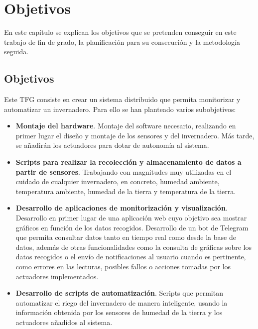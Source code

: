 \documentclass[a4paper, 12pt, oneside]{book}
\begin{document}
\cleardoublepage %
\chapter{Objetivos} %
\label{chap:objetivos} %
En este capítulo se explican los objetivos que se pretenden conseguir en este trabajo de fin de grado, la planificación para su consecución y la metodología seguida.


\section{Objetivos}
\label{sec:objetivos}

Este TFG consiste en crear un sistema distribuido que permita monitorizar y automatizar un invernadero. Para ello se han planteado varios subobjetivos:

\begin{itemize}
\item \textbf{Montaje del hardware}. Montaje del software necesario, realizando en primer lugar el diseño y montaje de los sensores y del invernadero. Más tarde, se añadirán los actuadores para dotar de autonomía al sistema. 

\item \textbf{Scripts para realizar la recolección y almacenamiento de datos a partir de sensores}. Trabajando con magnitudes muy utilizadas en el cuidado de cualquier invernadero, en concreto, humedad ambiente, temperatura ambiente, humedad de la tierra y temperatura de la tierra.

\item \textbf{Desarrollo de aplicaciones de monitorización y visualización}. Desarrollo en primer lugar de una aplicación web cuyo objetivo sea mostrar gráficos en función de los datos recogidos.
Desarrollo de un bot de Telegram que permita consultar datos tanto en tiempo real como desde la base de datos, además de otras funcionalidades como la consulta de gráficas sobre los datos recogidos o el envío de notificaciones al usuario cuando es pertinente, como errores en las lecturas, posibles fallos o acciones tomadas por los actuadores implementados.

\item \textbf{Desarrollo de scripts de automatización}. Scripts que permitan automatizar el riego del invernadero de manera inteligente, usando la información obtenida por los sensores de humedad de la tierra y los actuadores añadidos al sistema. 
\end{itemize}
\end{document}
